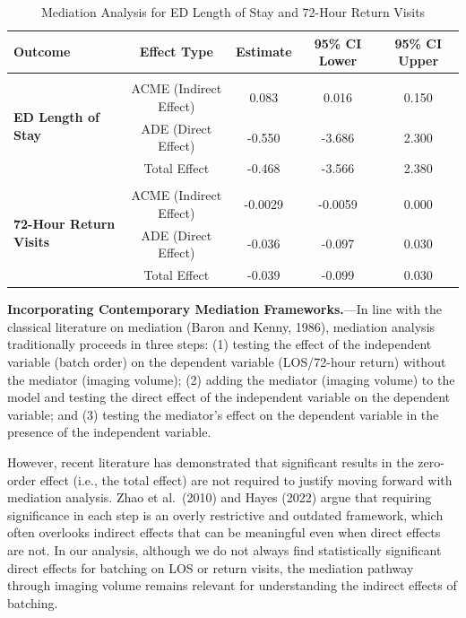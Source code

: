 \documentclass{article}
\begin{document}
\begin{table}[h]
\centering
\caption{Mediation Analysis for ED Length of Stay and 72-Hour Return Visits}
\label{tab:med_results}
\begin{tabular}{lcccc}
\hline
Outcome      & Effect Type & Estimate & 95\% CI Lower & 95\% CI Upper \\ \hline
\multirow{4}{*}{\textbf{ED Length of Stay}} 
& & & & \\
    & ACME (Indirect Effect)  & 0.083   & 0.016  & 0.150  \\
    & ADE (Direct Effect)     & -0.550  & -3.686 & 2.300  \\
    & Total Effect            & -0.468  & -3.566 & 2.380  \\ \hline
\multirow{4}{*}{\textbf{72-Hour Return Visits}} 
& & & & \\
    & ACME (Indirect Effect)  & -0.0029  & -0.0059 & 0.000  \\
    & ADE (Direct Effect)     & -0.036   & -0.097  & 0.030  \\
    & Total Effect            & -0.039   & -0.099  & 0.030  \\ \hline
\end{tabular}
\end{table}

\textbf{Incorporating Contemporary Mediation Frameworks.}---In line with
the classical literature on mediation (Baron and Kenny, 1986), mediation
analysis traditionally proceeds in three steps: (1) testing the effect
of the independent variable (batch order) on the dependent variable
(LOS/72-hour return) without the mediator (imaging volume); (2) adding
the mediator (imaging volume) to the model and testing the direct effect
of the independent variable on the dependent variable; and (3) testing
the mediator's effect on the dependent variable in the presence of the
independent variable.

However, recent literature has demonstrated that significant results in
the zero-order effect (i.e., the total effect) are not required to
justify moving forward with mediation analysis. Zhao et al.~(2010) and
Hayes (2022) argue that requiring significance in each step is an overly
restrictive and outdated framework, which often overlooks indirect
effects that can be meaningful even when direct effects are not. In our
analysis, although we do not always find statistically significant
direct effects for batching on LOS or return visits, the mediation
pathway through imaging volume remains relevant for understanding the
indirect effects of batching.
\end{document}
